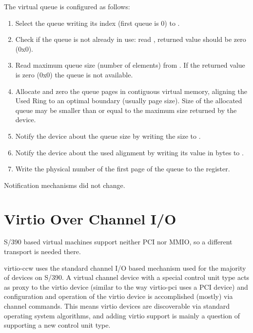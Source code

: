 The virtual queue is configured as follows:
\begin{enumerate}
\item Select the queue writing its index (first queue is 0) to
   .

\item Check if the queue is not already in use: read ,
   returned value should be zero (0x0).

\item Read maximum queue size (number of elements) from
   . If the returned value is zero (0x0) the
   queue is not available.

\item Allocate and zero the queue pages in contiguous virtual
   memory, aligning the Used Ring to an optimal boundary (usually
   page size). Size of the allocated queue may be smaller than or
   equal to the maximum size returned by the device.

\item Notify the device about the queue size by writing the size to
   .

\item Notify the device about the used alignment by writing its value
   in bytes to .

\item Write the physical number of the first page of the queue to
   the  register.
\end{enumerate}

Notification mechanisms did not change.

\section{Virtio Over Channel I/O}\label{sec:Virtio Transport Options / Virtio Over Channel I/O}

S/390 based virtual machines support neither PCI nor MMIO, so a
different transport is needed there.

virtio-ccw uses the standard channel I/O based mechanism used for
the majority of devices on S/390. A virtual channel device with a
special control unit type acts as proxy to the virtio device
(similar to the way virtio-pci uses a PCI device) and
configuration and operation of the virtio device is accomplished
(mostly) via channel commands. This means virtio devices are
discoverable via standard operating system algorithms, and adding
virtio support is mainly a question of supporting a new control
unit type.

